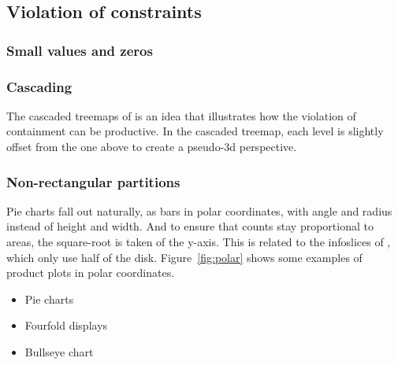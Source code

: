\documentclass[letterpaper,oneside]{scrartcl}
\begin{document}
\subsection{Violation of constraints}

\subsubsection{Small values and zeros}
\subsubsection{Cascading}

The cascaded treemaps of \citet{lu:2008} is an idea that illustrates how the violation of containment can be productive.  In the cascaded treemap, each level is slightly offset from the one above to create a pseudo-3d perspective.

\subsubsection{Non-rectangular partitions}

Pie charts fall out naturally, as bars in polar coordinates, with angle and radius instead of height and width. And to ensure that counts stay proportional to areas, the square-root is taken of the y-axis. This is related to the infoslices of \citet{andrews:1998}, which only use half of the disk. Figure~\ref{fig:polar} shows some examples of product plots in polar coordinates.

\begin{itemize}
  \item Pie charts
  \item Fourfold displays \citep{friendly:1995}
  \item Bullseye chart
\end{itemize}
\end{document}
